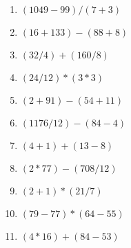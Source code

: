\documentclass{article}%
\begin{document}
%
\normalsize%
\begin{multicols}{2}%
\begin{enumerate}%
\item%
$(1049{-}99)/(7+3)$%
\item%
$(16+133){-}(88+8)$%
\item%
$(32/4)+(160/8)$%
\item%
$(24/12)*(3*3)$%
\item%
$(2+91){-}(54+11)$%
\item%
$(1176/12){-}(84{-}4)$%
\item%
$(4+1)+(13{-}8)$%
\item%
$(2*77){-}(708/12)$%
\item%
$(2+1)*(21/7)$%
\item%
$(79{-}77)*(64{-}55)$%
\item%
$(4*16)+(84{-}53)$%
\end{enumerate}%
\end{multicols}%
\end{document}
